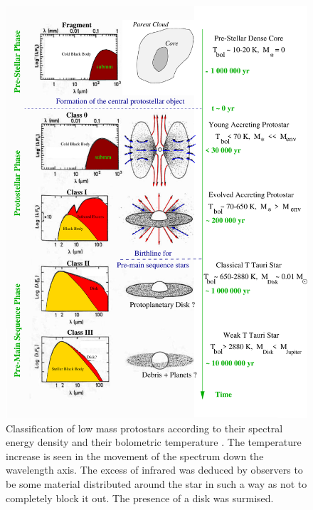 \begin{figure}[th]
\centering
\includegraphics[width=14cm]{evolution}
\caption{ Classification of low mass protostars according to their spectral energy
density and their bolometric temperature \citep{1993ApJ...406..122A}. The temperature increase is seen in the movement of the spectrum down the
wavelength axis. 
The excess of infrared was deduced by observers to be some material distributed around the star in such a way as not to completely block it out. 
The presence of a disk was surmised. 
}
\label{fig:1-1} %
\end{figure}
\clearpage
\newpage

